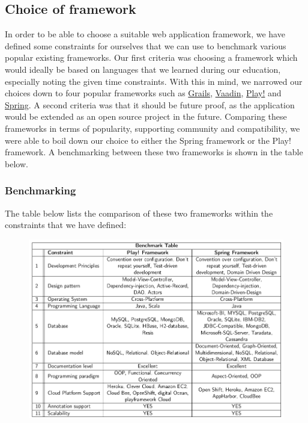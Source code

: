 \subsection{Choice of framework}
In order to be able to choose a suitable web application framework, we have defined some constraints for ourselves that we can use to benchmark various popular existing frameworks. Our first criteria was choosing a framework which would ideally be based on languages that we learned during our education, especially noting the given time constraints. With this in mind, we narrowed our choices down to four popular frameworks such as \href{https://grails.org/}{Grails}, \href{https://vaadin.com/home}{Vaadin}, \href{https://www.playframework.com/}{Play!} and \href{http://projects.spring.io/spring-framework/}{Spring}. A second criteria was that it should be future proof, as the application would be extended as an open source project in the future. Comparing these frameworks in terms of popularity, supporting community and compatibility, we were able to boil down our choice to either the Spring framework or the Play! framework. A benchmarking between these two frameworks is shown in the table below.
\subsubsection{Benchmarking}
 The table below lists the comparison of these two frameworks within the constraints that we have defined:\\

\begin{figure}[h]
\centering
\includegraphics[scale=0.5]{./img/benchmark.png}	
\end{figure}


